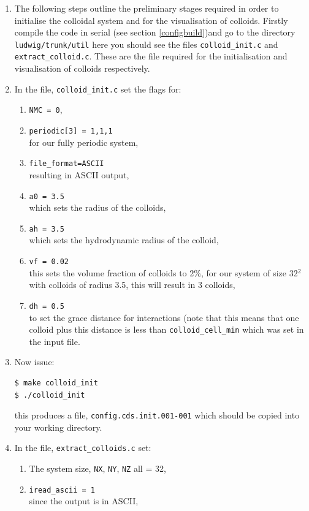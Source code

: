 \documentclass[11pt,twoside,a4paper]{article}
\begin{document}
\begin{enumerate}
\item The following steps outline the preliminary stages required in order to initialise the colloidal system and for the visualisation of colloids. Firstly compile the code in serial (see section \ref{configbuild})and go to the directory \texttt{ludwig/trunk/util} here you should see the files \texttt{colloid\_init.c} and \texttt{extract\_colloid.c}. These are the file required for the initialisation and visualisation of colloids respectively.
\item In the file, \texttt{colloid\_init.c} set the flags for:
\begin{enumerate}
\item \texttt{NMC = 0},
\item \texttt{periodic[3] = {1,1,1}} \\ for our fully periodic system,
\item \texttt{file\_format=ASCII} \\ resulting in ASCII output,
\item \texttt{a0 = 3.5} \\ which sets the radius of the colloids,
\item \texttt{ah = 3.5} \\ which sets the hydrodynamic radius of the colloid,
\item \texttt{vf = 0.02} \\ this sets the volume fraction of colloids to 2\%, for our system of size 32$^2$ with colloids of radius 3.5, this will result in 3 colloids,
\item \texttt{dh = 0.5} \\ to set the grace distance for interactions (note that this means that one colloid plus this distance is less than \texttt{colloid\_cell\_min} which was set in the input file.
\end{enumerate}
\item Now issue: \\
\begin{lstlisting}
$ make colloid_init
$ ./colloid_init
\end{lstlisting}
this produces a file, \texttt{config.cds.init.001-001} which should be copied into your working directory.
\item In the file, \texttt{extract\_colloids.c} set:
\begin{enumerate}
\item The system size, \texttt{NX},  \texttt{NY},  \texttt{NZ} all = 32,
\item \texttt{iread\_ascii = 1} \\ since the output is in ASCII,

\end{enumerate}
\end{enumerate}
\end{document}
